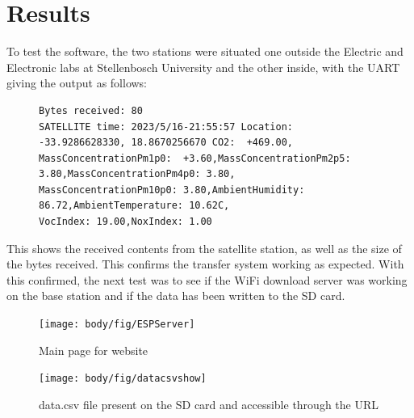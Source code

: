   
\chapter{Results}
To test the software, the two stations were situated one outside the Electric and Electronic labs at Stellenbosch University and the other inside, with the UART giving the output as follows:
\begin{figure}[!htb]
\begin{lstlisting}
Bytes received: 80
SATELLITE time: 2023/5/16-21:55:57 Location: -33.9286628330, 18.8670256670 CO2:  +469.00,
MassConcentrationPm1p0:  +3.60,MassConcentrationPm2p5: 3.80,MassConcentrationPm4p0: 3.80,
MassConcentrationPm10p0: 3.80,AmbientHumidity: 86.72,AmbientTemperature: 10.62C,
VocIndex: 19.00,NoxIndex: 1.00
\end{lstlisting}
\end{figure}

\noindent
This shows the received contents from the satellite station, as well as the size of the bytes received. This confirms the transfer system working as expected. With this confirmed, the next test was to see if the WiFi download server was working on the base station and if the data has been written to the SD card.

\begin{figure}[!htb]
	\texttt{[image: body/fig/ESPServer]}
	\caption{Main page for website}
	\label{fig:espserver}
	\endminipage\hfill
	\texttt{[image: body/fig/datacsvshow]}
	\caption{data.csv file present on the SD card and accessible through the URL}
	\label{fig:datacsvshow}
	\endminipage\hfill
\end{figure}

